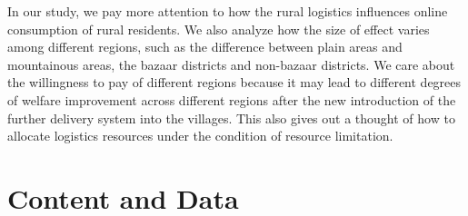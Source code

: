 \documentclass{article}
\begin{document}
\mbox{\hspace{2em}}
In our study, we pay more attention to how the rural logistics influences online consumption of rural residents. We also analyze how the size of effect varies among different regions, such as the difference between plain areas and mountainous areas, the bazaar districts and non-bazaar districts. We care about the willingness to pay of different regions because it may lead to different degrees of welfare improvement across different regions after the new introduction of the further delivery system into the villages. This also gives out a thought of how to allocate logistics resources under the condition of resource limitation.\\
\section{Content and Data}
\end{document}
